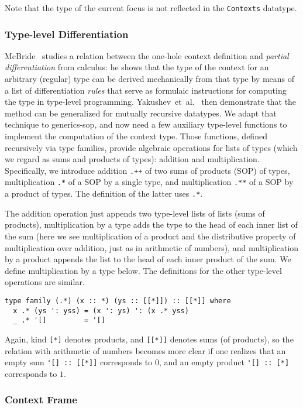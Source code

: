 \documentclass[runningheads]{llncs}
\newcommand{\K}[1]{\lstinline{#1}}
\begin{document}
Note that the type of the current focus is not reflected in the \K{Contexts} datatype.

\subsubsection{Type-level Differentiation}

McBride~\cite{McBride2001} studies a relation between the one-hole context definition and \emph{partial differentiation} from calculus: he shows that the type of the context for an arbitrary (regular) type can be derived mechanically from that type by means of a list of differentiation \emph{rules} that serve as formulaic instructions for computing the type in type-level programming. Yakushev~et~al.~\cite{MuRec2009} then demonstrate that the method can be generalized for mutually recursive datatypes. We adapt that technique to \textsf{generics-sop}, and now need a few auxiliary type-level functions to implement the computation of the context type. Those functions, defined recursively via type families, provide algebraic operations for lists of types (which we regard as sums and products of types): addition and multiplication. Specifically, we introduce addition \K{.++} of two sums of products (SOP) of types, multiplication \K{.*} of a SOP by a single type, and multiplication \K{.**} of a SOP by a product of types. The definition of the latter uses \K{.*}.

The addition operation just appends two type-level lists of lists (sums of products), multiplication by a type adds the type to the head of each inner list of the sum (here we see multiplication of a product and the distributive property of multiplication over addition, just as in arithmetic of numbers), and multiplication by a product appends the list to the head of each inner product of the sum. We define multiplication by a type below. The definitions for the other type-level operations are similar.
\begin{lstlisting}
type family (.*) (x :: *) (ys :: [[*]]) :: [[*]] where
  x .* (ys ': yss) = (x ': ys) ': (x .* yss)
  _ .* '[]         = '[]
\end{lstlisting}

Again, kind \K{[*]} denotes products, and \K{[[*]]} denotes sums (of products), so the relation with arithmetic of numbers becomes more clear if one realizes that an empty sum \K{'[] :: [[*]]} corresponds to $0$, and an empty product \K{'[] :: [*]} corresponds to $1$.

\subsubsection{Context Frame}
\end{document}
